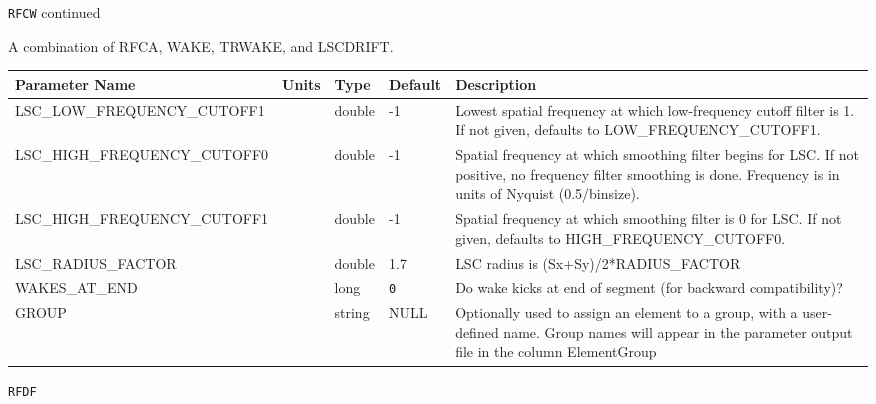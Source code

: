 \newpage
\begin{center}{\Large\verb|RFCW| continued}\end{center}
A combination of RFCA, WAKE, TRWAKE, and LSCDRIFT.
\\
\begin{tabular}{|l|l|l|l|p{\descwidth}|} \hline
Parameter Name & Units & Type & Default & Description \\ \hline 
LSC\_LOW\_FREQUENCY\_CUTOFF1 &  & double &   -1 & Lowest spatial frequency at which low-frequency cutoff filter is 1.  If not given, defaults to LOW\_FREQUENCY\_CUTOFF1.  \\ \hline 
LSC\_HIGH\_FREQUENCY\_CUTOFF0 &  & double &   -1 & Spatial frequency at which smoothing filter begins for LSC.  If not positive, no frequency filter smoothing is done.  Frequency is in units of Nyquist (0.5/binsize).  \\ \hline 
LSC\_HIGH\_FREQUENCY\_CUTOFF1 &  & double &   -1 & Spatial frequency at which smoothing filter is 0 for LSC.  If not given, defaults to HIGH\_FREQUENCY\_CUTOFF0.  \\ \hline 
LSC\_RADIUS\_FACTOR &  & double &   1.7 & LSC radius is (Sx+Sy)/2*RADIUS\_FACTOR  \\ \hline 
WAKES\_AT\_END &  & long &  \verb|0| & Do wake kicks at end of segment (for backward compatibility)?  \\ \hline 
GROUP &  & string & NULL & Optionally used to assign an element to a group, with a user-defined name.  Group names will appear in the parameter output file in the column ElementGroup  \\ \hline 
\end{tabular}

\vspace*{0.5in}

\newpage
\begin{center}{\Large\verb|RFDF|}\end{center}
